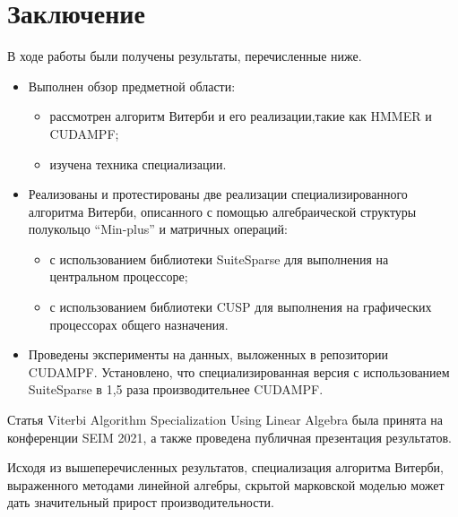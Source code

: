 \section{Заключение}
В ходе работы были получены результаты, перечисленные ниже.
\begin{itemize}
	\item Выполнен обзор предметной области:
		\begin{itemize}
			\item рассмотрен алгоритм Витерби и его реализации,такие как HMMER и CUDAMPF;
			\item изучена техника специализации.
		\end{itemize}
	\item Реализованы и протестированы две реализации специализированного алгоритма Витерби, описанного с помощью алгебраической структуры полукольцо “Min-plus” и матричных операций:
		\begin{itemize}
			\item с использованием библиотеки SuiteSparse для выполнения на центральном процессоре;
			\item с использованием библиотеки CUSP для выполнения на графических процессорах общего назначения.
		\end{itemize}
	\item Проведены эксперименты на данных, выложенных в репозитории CUDAMPF. Установлено, что специализированная версия с использованием SuiteSparse в 1,5 раза производительнее CUDAMPF.
\end{itemize}

Статья Viterbi Algorithm Specialization Using Linear Algebra 
была принята на конференции SEIM 2021, а также проведена 
публичная презентация результатов.

Исходя из вышеперечисленных результатов, специализация 
алгоритма Витерби, выраженного методами линейной алгебры, 
скрытой марковской моделью может дать значительный прирост 
производительности.
